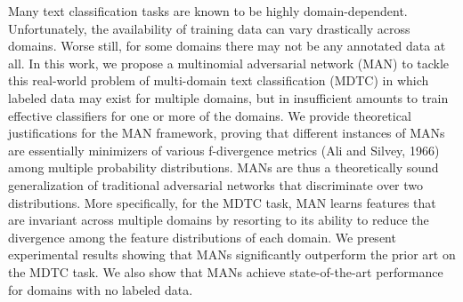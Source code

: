 Many text classification tasks are known to be highly domain-dependent. Unfortunately, the availability of training data can vary drastically across domains. Worse still, for some domains there may not be any annotated data at all. In this work, we propose a multinomial adversarial network (MAN) to tackle this real-world problem of multi-domain text classification (MDTC) in which labeled data may exist for multiple domains, but in insufficient amounts to train effective classifiers for one or more of the domains. We provide theoretical justifications for the MAN framework, proving that different instances of MANs are essentially minimizers of various f-divergence metrics (Ali and Silvey, 1966) among multiple probability distributions. MANs are thus a theoretically sound generalization of traditional adversarial networks that discriminate over two distributions. More specifically, for the MDTC task, MAN learns features that are invariant across multiple domains by resorting to its ability to reduce the divergence among the feature distributions of each domain. We present experimental results showing that MANs significantly outperform the prior art on the MDTC task. We also show that MANs achieve state-of-the-art performance for domains with no labeled data.
